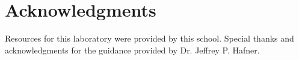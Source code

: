 \documentclass[
    10pt,aps,prl,
    amsfonts,
    amssymb,
    amsmath,
    runinaddress,
    secnum,
    showkeys,
    superscriptaddress,
    twocolumn,
]{revtex4}
\begin{document}
\section{Acknowledgments}
\label{sec:ack}
\begin{acknowledgments}
    Resources for this laboratory were provided by this school.
    Special thanks and acknowledgments for the guidance provided by Dr. Jeffrey P. Hafner.
\end{acknowledgments}




\end{document}
